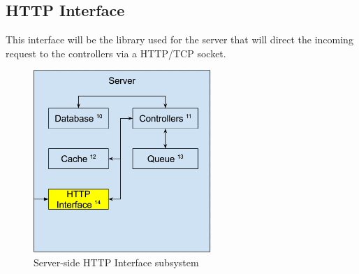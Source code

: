\subsection{HTTP Interface}
This interface will be the library used for the server that will direct the incoming request to the controllers via a HTTP/TCP socket.

\begin{figure}[h!]
	\centering
 	\includegraphics[width=0.60\textwidth]{images/server/server_http_interface.png}
 	\caption{Server-side HTTP Interface subsystem}
\end{figure}



\newpage

